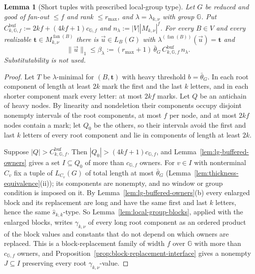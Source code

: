 \documentclass[11pt]{article}
\numberwithin{equation}{section}
\theoremstyle{plain}
\newtheorem{lemma}[theorem]{Lemma}
\theoremstyle{definition}
\theoremstyle{remark}
\newcommand{\tuple}[1]{\vec{#1}}
\newcommand{\fan}{\operatorname{fan}}
\begin{document}
\begin{lemma}[Short tuples with prescribed local-group type]
\label{lem:local-group-shortest}
Let $G$ be reduced and good of fan-out $\le f$ and rank $\le r_{\max}$, and
$\lambda=\lambda_{k,\nu}$ with group ${\mathbb G}$.  Put
$C^{\mathrm{buf}}_{k,{\mathbb G},f}:=2kf+(4kf+1)c_{{\mathbb G},f}$ and
$n_\lambda:=|V||M_{k,\nu}|^f$.  For every $B\in V$ and every realizable
$\mathbf t\in M_{k,\nu}^{\fan(B)}$ there is $\tuple u\in L_B(G)$ with
$\lambda^{(\fan(B))}(\tuple u)=\mathbf t$ and
\[
 \|\tuple u\|_1\le\beta_\lambda:=(r_{\max}+1)\,\bar\theta_G\,
 C^{\mathrm{buf}}_{k,{\mathbb G},f}\,n_\lambda .
\]
Substitutability is not used.
\end{lemma}

\begin{proof}
Let $T$ be $\lambda$-minimal for $(B,\mathbf t)$ with heavy threshold
$b=\bar\theta_G$.  In each root component of length at least $2k$ mark the first
and the last $k$ letters, and in each shorter component mark every letter: at
most $2kf$ marks.  Let $Q$ be an antichain of heavy nodes.  By linearity and
nondeletion their components occupy disjoint nonempty intervals of the root
components, at most $f$ per node, and at most $2kf$ nodes contain a mark; let
$Q_0$ be the others, so their intervals avoid the first and last $k$ letters of
every root component and lie in components of length at least $2k$.

Suppose $|Q|>C^{\mathrm{buf}}_{k,{\mathbb G},f}$.  Then
$|Q_0|>(4kf+1)c_{{\mathbb G},f}$, and Lemma~\ref{lem:lg-buffered-owners} gives a set
$I\subseteq Q_0$ of more than $c_{{\mathbb G},f}$ owners.  For $v\in I$ with nonterminal
$C_v$ fix a tuple of $L_{C_v}(G)$ of total length at most $\bar\theta_G$
(Lemma~\ref{lem:thickness-equivalence}(ii)); its components are nonempty, and no
window or group condition is imposed on it.  By
Lemma~\ref{lem:lg-buffered-owners}(b) every enlarged block and its replacement
are long and have the same first and last $k$ letters, hence the same
$\widehat s_{k,k}$-type.  So Lemma~\ref{lem:local-group-blocks}, applied with the
enlarged blocks, writes $\gamma_{k,\nu}$ of every long root component as an
ordered product of the block values and constants that do not depend on which
owners are replaced.  This is a block-replacement family of width $f$ over ${\mathbb G}$
with more than $c_{{\mathbb G},f}$ owners, and
Proposition~\ref{prop:block-replacement-interface} gives a nonempty $J\subseteq I$
preserving every root $\gamma_{k,\nu}$-value.


\end{proof}
\end{document}
